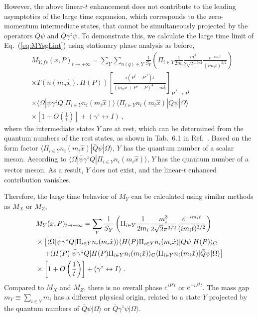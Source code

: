 \documentclass[a4paper,11pt]{article}
\begin{document}
However, the above linear-$t$ enhancement does not contribute to the leading asymptotics of the large time expansion, which corresponds to the zero-momentum intermediate states, that cannot be simultaneously projected by the operators $\bar{Q} \psi$ and $\bar{Q} \gamma^z \psi$. To demonstrate this, we calculate the large time limit of Eq.~(\ref{eq:MYsgLint}) using stationary phase analysis as before, 
\begin{align}\label{eq:MYsfLt}
&M_{Y,fs}(x,P)_{t\rightarrow+\infty} =  \sum_{Y} \sum_{n(q) \in Y} \frac{1}{S_Y} \left( \Pi_{i \in Y} \frac{1}{2 m_i}  \frac{m_i^3}{2\sqrt{2} \pi^{3/2}}  \frac{e^{-i m_i t}}{(i m_i t)^{3/2}}  \right) \nonumber\\
&\times T(n(m_n \hat{x}),H(P)) \left[ \frac{i (P^t -P'^t) t}{(m_n \hat{x}+P'-P)^2 - m_n^2} \right]_{P'^t \rightarrow P^t} \nonumber\\
&\times \langle \Omega | \bar{\psi} \gamma^z Q | \Pi_{i \in Y} n_i( m_i \hat{x} ) \rangle \,  \langle \Pi_{i \in Y} n_i( m_i \hat{x} ) | \bar{Q}  \psi | \Omega \rangle  \nonumber\\
&\times \left[1+O\left(\frac{1}{t}\right)\right] + (\gamma^z \leftrightarrow I) \ ,
\end{align}
where the intermediate states $Y$ are at rest, which can be determined from the quantum numbers of the rest states, as shown in Tab.~6.1 in Ref.~\cite{Gattringer:2010zz}. Based on the form factor $\langle \Pi_{i \in Y} n_i( m_i \hat{x} ) | \bar{Q}  \psi | \Omega \rangle$, $Y$ has the quantum number of a scalar meson. According to $\langle \Omega | \bar{\psi} \gamma^z Q | \Pi_{i \in Y} n_i( m_i \hat{x} ) \rangle$, $Y$ has the quantum number of a vector meson. As a result, $Y$ does not exist, and the linear-$t$ enhanced contribution vanishes. 

Therefore, the large time behavior of $M_Y$ can be calculated using similar methods as $M_X$ or $M_Z$,
\begin{align}\label{eq:MY}
&M_{Y}(x,P)_{t\rightarrow+\infty} =  \sum_{Y} \frac{1}{S_Y} \left( \Pi_{i \in Y} \frac{1}{2 m_i}  \frac{m_i^3}{2\sqrt{2} \pi^{3/2}}  \frac{e^{-i m_i t}}{(i m_i t)^{3/2}}  \right) \nonumber\\
&\times \left[ \langle \Omega | \bar{\psi} \gamma^z Q | \Pi_{i \in Y} n_i( m_i \hat{x} ) \rangle \langle H(P) \Pi_{i \in Y} n_i( m_i \hat{x} ) | \bar{Q}  \psi | H(P) \rangle_{\rm C} \right. \nonumber\\
&\left. \quad + \langle H(P) | \bar{\psi} \gamma^z Q | H(P) \Pi_{i \in Y} n_i( m_i \hat{x} ) \rangle_{\rm C} \langle \Pi_{i \in Y} n_i( m_i \hat{x} ) | \bar{Q}  \psi | \Omega \rangle \right] \nonumber\\
&\times \left[1+O\left(\frac{1}{t}\right)\right]+ (\gamma^z \leftrightarrow I)  \ .
\end{align}
Compared to $M_X$ and $M_Z$, there is no overall phase $e^{i P^t t}$ or $e^{-i P^t t}$. The mass gap $m_Y \equiv \sum_{i\in Y} m_i$ has a different physical origin, related to a state $Y$ projected by the quantum numbers of $\bar{Q}  \psi | \Omega \rangle$ or $\bar{Q} \gamma^z \psi | \Omega \rangle$.
\end{document}
